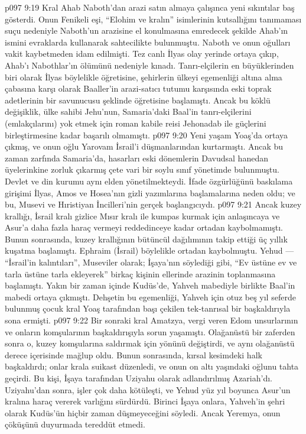 \vs p097 9:19 Kral Ahab Naboth’dan arazi satın almaya çalışınca yeni sıkıntılar baş gösterdi. Onun Fenikeli eşi, “Elohim ve kralın” isimlerinin kutsallığını tanımaması suçu nedeniyle Naboth’un arazisine el konulmasına emredecek şekilde Ahab’ın ismini evraklarda kullanarak sahtecilikte bulunmuştu. Naboth ve onun oğulları vakit kaybetmeden idam edilmişti. Tez canlı İlyas olay yerinde ortaya çıkıp, Ahab’ı Nabothlar’ın ölümünü nedeniyle kınadı. Tanrı\hyp{}elçilerin en büyüklerinden biri olarak İlyas böylelikle öğretisine, şehirlerin ülkeyi egemenliği altına alma çabasına karşı olarak Baaller’in arazi\hyp{}satıcı tutumu karşısında eski toprak adetlerinin bir savunucusu şeklinde öğretisine başlamıştı. Ancak bu köklü değişiklik, ülke sahibi Jehu’nun, Samaria’daki Baal’in tanrı\hyp{}elçilerini (emlakçılarını) yok etmek için roman kabile reisi Jehonadab ile güçlerini birleştirmesine kadar başarılı olmamıştı.
\vs p097 9:20 Yeni yaşam Yoaş’da ortaya çıkmış, ve onun oğlu Yarovam İsrail’i düşmanlarından kurtarmıştı. Ancak bu zaman zarfında Samaria’da, hasarları eski dönemlerin Davudsal hanedan üyelerinkine zorluk çıkarmış çete vari bir soylu sınıf yönetimde bulunmuştu. Devlet ve din kurumu aynı elden yönetilmekteydi. İfade özgürlüğünü baskılama girişimi İlyas, Amos ve Hosea’nın gizli yazımlarına başlamalarına neden oldu; ve bu, Musevi ve Hıristiyan İncilleri’nin gerçek başlangıcıydı.
\vs p097 9:21 Ancak kuzey krallığı, İsrail kralı gizlice Mısır kralı ile kumpas kurmak için anlaşıncaya ve Asur’a daha fazla haraç vermeyi reddedinceye kadar ortadan kaybolmamıştı. Bunun sonrasında, kuzey krallığının bütüncül dağılımının takip ettiği üç yıllık kuşatma başlamıştı. Ephraim (İsrail) böylelikle ortadan kaybolmuştu. Yehud --- “İsrail’in kalıntıları”, Museviler olarak; İşaya’nın söylediği gibi, “Ev üstüne ev ve tarla üstüne tarla ekleyerek” birkaç kişinin ellerinde arazinin toplanmasına başlamıştı. Yakın bir zaman içinde Kudüs’de, Yahveh mabediyle birlikte Baal’in mabedi ortaya çıkmıştı. Dehşetin bu egemenliği, Yahveh için otuz beş yıl seferde bulunmuş çocuk kral Yoaş tarafından başı çekilen tek\hyp{}tanrısal bir başkaldırıyla sona ermişti.
\vs p097 9:22 Bir sonraki kral Amatzya, vergi veren Edom unsurlarının ve onların komşularının başkaldırışıyla sorun yaşamıştı. Olağanüstü bir zaferden sonra o, kuzey komşularına saldırmak için yönünü değiştirdi, ve aynı olağanüstü derece içerisinde mağlup oldu. Bunun sonrasında, kırsal kesimdeki halk başkaldırdı; onlar krala suikast düzenledi, ve onun on altı yaşındaki oğlunu tahta geçirdi. Bu kişi, İşaya tarafından Uziyahu olarak adlandırılmış Azariah’dı. Uziyahu’dan sonra, işler çok daha kötüleşti, ve Yehud yüz yıl boyunca Asur’un kralına haraç vererek varlığını sürdürdü. Birinci İşaya onlara, Yahveh’in şehri olarak Kudüs’ün hiçbir zaman düşmeyeceğini söyledi. Ancak Yeremya, onun çöküşünü duyurmada tereddüt etmedi.
